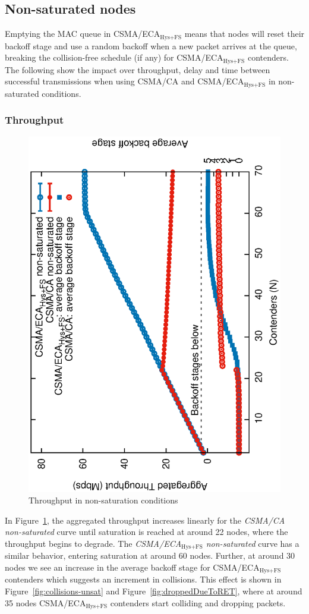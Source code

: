 	\subsection{Non-saturated nodes}\label{resultsUnsaturated}
	Emptying the MAC queue in CSMA/ECA$_{\text{Hys+FS}}$ means that nodes will reset their backoff stage and use a random backoff when a new packet arrives at the queue, breaking the collision-free schedule (if any) for CSMA/ECA$_{\text{Hys+FS}}$ contenders. The following show the impact over throughput, delay and time between successful transmissions when using CSMA/CA and CSMA/ECA$_{\text{Hys+FS}}$ in non-saturated conditions.\\
	
	\subsubsection{Throughput}
	
   	\begin{figure}[tb]
		\centering
		\includegraphics[width=0.7\linewidth,angle=-90]{figures/unsaturated/throughput-unsaturated/throughput-unsaturated-w-BOS-TON.eps}
		\caption{Throughput in non-saturation conditions}
		\label{fig:throughputUnsat}
	\end{figure}
	
	In Figure~\ref{fig:throughputUnsat}, the aggregated throughput increases linearly for the \emph{CSMA/CA non-saturated} curve until saturation is reached at around 22 nodes, where the throughput begins to degrade. The \emph{CSMA/ECA$_{\text{Hys+FS}}$ non-saturated} curve has a similar behavior, entering saturation at around 60 nodes. Further, at around 30 nodes we see an increase in the average backoff stage for CSMA/ECA$_{\text{Hys+FS}}$ contenders which suggests an increment in collisions. This effect is shown in Figure~\ref{fig:collisions-unsat} and Figure~\ref{fig:droppedDueToRET}, where at around 35 nodes CSMA/ECA$_{\text{Hys+FS}}$ contenders start colliding and dropping packets. 
	
